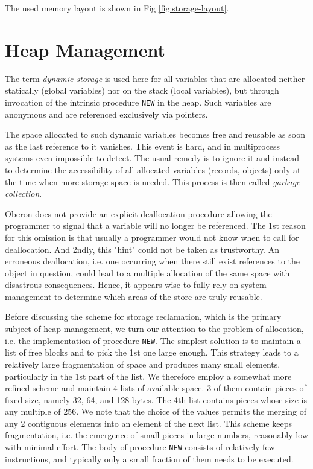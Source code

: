 The used memory layout is shown in Fig \ref{fig:storage-layout}.

\section{Heap Management}
The term \emph{dynamic storage} is used here for all variables that are allocated neither
statically (global variables) nor on the stack (local variables), but through invocation
of the intrinsic procedure \verb|NEW| in the heap. Such variables are anonymous and are
referenced exclusively via pointers.

The space allocated to such dynamic variables becomes free and reusable as soon as the last
reference to it vanishes. This event is hard, and in multiprocess systems even impossible
to detect. The usual remedy is to ignore it and instead to determine the accessibility of
all allocated variables (records, objects) only at the time when more storage space is needed.
This process is then called \emph{garbage collection}.

Oberon does not provide an explicit deallocation procedure allowing the programmer to signal
that a variable will no longer be referenced. The 1st reason for this omission is that
usually a programmer would not know when to call for deallocation. And 2ndly, this "hint"
could not be taken as trustworthy. An erroneous deallocation, i.e. one occurring when there
still exist references to the object in question, could lead to a multiple allocation of
the same space with disastrous consequences. Hence, it appears wise to fully rely on system
management to determine which areas of the store are truly reusable.

Before discussing the scheme for storage reclamation, which is the primary subject of
heap management, we turn our attention to the problem of allocation, i.e. the implementation
of procedure \verb|NEW|. The simplest solution is to maintain a list of free blocks and to
pick the 1st one large enough. This strategy leads to a relatively large fragmentation of
space and produces many small elements, particularly in the 1st part of the list. We
therefore employ a somewhat more refined scheme and maintain 4 lists of available space.
3 of them contain pieces of fixed size, namely 32, 64, and 128 bytes. The 4th list contains
pieces whose size is any multiple of 256. We note that the choice of the values permits the
merging of any 2 contiguous elements into an element of the next list. This scheme keeps
fragmentation, i.e. the emergence of small pieces in large numbers, reasonably low with
minimal effort. The body of procedure \verb|NEW| consists of relatively few instructions,
and typically only a small fraction of them needs to be executed.

